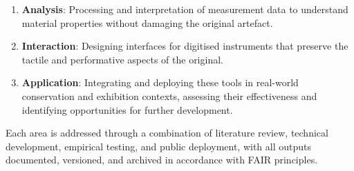 \begin{enumerate}
    \item \textbf{Analysis}: Processing and interpretation of measurement data to understand material properties without damaging the original artefact.
    \item \textbf{Interaction}: Designing interfaces for digitised instruments that preserve the tactile and performative aspects of the original.
    \item \textbf{Application}: Integrating and deploying these tools in real-world conservation and exhibition contexts, assessing their effectiveness and identifying opportunities for further development.
\end{enumerate}

Each area is addressed through a combination of literature review, technical development, empirical testing, and public deployment, with all outputs documented, versioned, and archived in accordance with FAIR principles.



